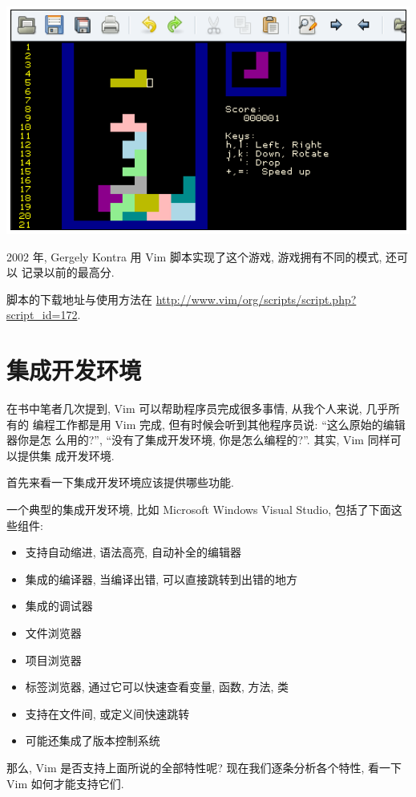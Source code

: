 \begin{center}
    \includegraphics[scale=0.7]{./images/page206.png}
\end{center}

2002 年, Gergely Kontra 用 Vim 脚本实现了这个游戏, 游戏拥有不同的模式, 还可以
记录以前的最高分.

脚本的下载地址与使用方法在
\url{http://www.vim/org/scripts/script.php?script_id=172}.

\section{集成开发环境}
\label{sec:programmers_ide}

在书中笔者几次提到, Vim 可以帮助程序员完成很多事情, 从我个人来说, 几乎所有的
编程工作都是用 Vim 完成, 但有时候会听到其他程序员说: ``这么原始的编辑器你是怎
么用的?'', ``没有了集成开发环境, 你是怎么编程的?''. 其实, Vim 同样可以提供集
成开发环境.

首先来看一下集成开发环境应该提供哪些功能.

一个典型的集成开发环境, 比如 Microsoft Windows Visual Studio\textregistered,
包括了下面这些组件:
\begin{itemize}
    \item 支持自动缩进, 语法高亮, 自动补全的编辑器
    \item 集成的编译器, 当编译出错, 可以直接跳转到出错的地方
    \item 集成的调试器
    \item 文件浏览器
    \item 项目浏览器
    \item 标签浏览器, 通过它可以快速查看变量, 函数, 方法, 类
    \item 支持在文件间, 或定义间快速跳转
    \item 可能还集成了版本控制系统
\end{itemize}
那么, Vim 是否支持上面所说的全部特性呢? 现在我们逐条分析各个特性, 看一下 Vim
如何才能支持它们.

